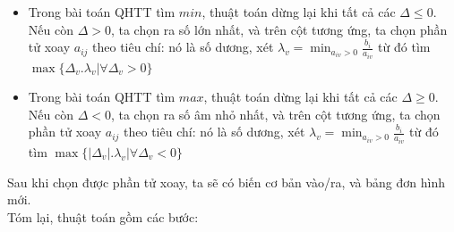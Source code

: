 \documentclass{article}
\begin{document}
\begin{itemize}
    \item Trong bài toán QHTT tìm \textbf{$min$}, thuật toán dừng lại khi tất cả các $\Delta \leq 0$. Nếu còn $\Delta > 0$, ta chọn ra số lớn nhất, và trên cột tương ứng, ta chọn phần tử xoay $a_{ij}$ theo tiêu chí: nó là số dương, xét $\lambda_v =  \displaystyle\min_{a_{iv}>0} \displaystyle\frac{b_i}{a_{iv}}$ từ đó tìm $\max\{\Delta_v . \lambda_v|\forall\Delta_v>0\}$
    \item Trong bài toán QHTT tìm \textbf{$max$}, thuật toán dừng lại khi tất cả các $\Delta \geq 0$. Nếu còn $\Delta < 0$, ta chọn ra số âm nhỏ nhất, và trên cột tương ứng, ta chọn phần tử xoay $a_{ij}$ theo tiêu chí: nó là số dương, xét $\lambda_v =  \displaystyle\min_{a_{iv}>0} \displaystyle\frac{b_i}{a_{iv}}$ từ đó tìm $\max\{|\Delta_v| . \lambda_v|\forall\Delta_v<0\}$
\end{itemize}
\hspace{0.4cm} Sau khi chọn được phần tử xoay, ta sẽ có biến cơ bản vào/ra, và bảng đơn hình mới.\medskip \\
Tóm lại, thuật toán gồm các bước:
\end{document}
